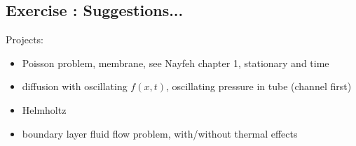 \documentclass[graybox,envcountchap,sectrefs,final]{svmonodo}
\newenvironment{doconceexercise}{}{}
\newcounter{doconceexercisecounter}
\begin{document}
\begin{doconceexercise}

\subsection*{Exercise \thedoconceexercisecounter: Suggestions...}

\label{scale::exer:suggest}

Projects:

\begin{itemize}
 \item Poisson problem, membrane, see Nayfeh chapter 1, stationary and time

 \item diffusion with oscillating $f(x,t)$,
   oscillating pressure in tube (channel first)

 \item Helmholtz

 \item boundary layer fluid flow problem, with/without thermal effects
\end{itemize}

\noindent
\end{doconceexercise}



\clearemptydoublepage
{}
\thispagestyle{empty}





\backmatter

\cleardoublepage{}  %
\printindex
\end{document}
